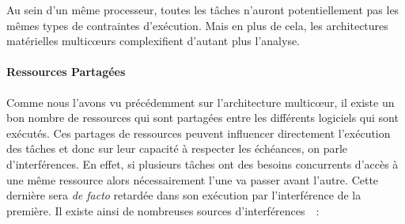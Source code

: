 \documentclass[french, a4paper, 11pt, twoside, pdftex]{StyleThese}
\begin{document}
		Au sein d'un même processeur, toutes les tâches n'auront potentiellement pas les mêmes types de contraintes d'exécution. Mais en plus de cela, les architectures matérielles multicœurs complexifient d'autant plus l'analyse. 
		
		
	\paragraph{Ressources Partagées}
	
	Comme nous l'avons vu précédemment sur l'architecture multicœur, il existe un bon nombre de ressources qui sont partagées entre les différents logiciels qui sont exécutés. Ces partages de ressources peuvent influencer directement l'exécution des tâches et donc sur leur capacité à respecter les échéances, on parle d'interférences. En effet, si plusieurs tâches ont des besoins concurrents d'accès à une même ressource alors nécessairement l'une va passer avant l'autre. Cette dernière sera \textit{de facto} retardée dans son exécution par l'interférence de la première. Il existe ainsi de nombreuses sources d'interférences~\cite{kotaba_multicore_2013}~: 
\end{document}

